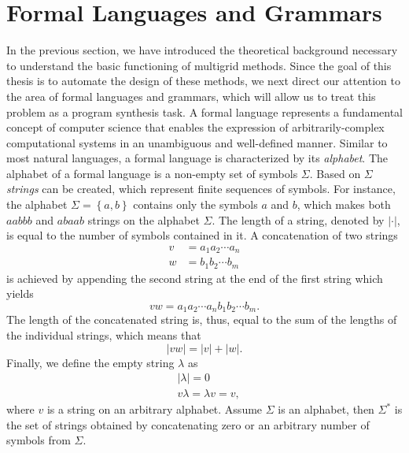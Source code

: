 \section{Formal Languages and Grammars}
\label{sec:formal-languages}
In the previous section, we have introduced the theoretical background necessary to understand the basic functioning of multigrid methods.
Since the goal of this thesis is to automate the design of these methods, we next direct our attention to the area of formal languages and grammars, which will allow us to treat this problem as a program synthesis task.
A formal language represents a fundamental concept of computer science that enables the expression of arbitrarily-complex computational systems in an unambiguous and well-defined manner.
Similar to most natural languages, a formal language is characterized by its \emph{alphabet}. 
The alphabet of a formal language is a non-empty set of symbols $\Sigma$.
Based on $\Sigma$ \emph{strings} can be created, which represent finite sequences of symbols.
For instance, the alphabet $\Sigma = \left\{a, b\right\}$ contains only the symbols $a$ and $b$, which makes both $aabbb$ and $abaab$ strings on the alphabet $\Sigma$.
The length of a string, denoted by $|\cdot|$, is equal to the number of symbols contained in it. 
A concatenation of two strings 
\begin{equation}
	\begin{split}
		v & = a_1 a_2 \cdots a_n \\
		w & = b_1 b_2 \cdots b_m
	\end{split}
\end{equation}
is achieved by appending the second string at the end of the first string which yields
\begin{equation}
	vw = a_1 a_2 \cdots a_n b_1 b_2 \cdots b_m.
\end{equation}
The length of the concatenated string is, thus, equal to the sum of the lengths of the individual strings, which means that
\begin{equation}
|vw| = |v| + |w|.
\end{equation}
Finally, we define the empty string $\lambda$ as
\begin{equation}
	\begin{split}
		& |\lambda| = 0 \\
		& v \lambda = \lambda v = v,
	\end{split}
\end{equation}
where $v$ is a string on an arbitrary alphabet.
Assume $\Sigma$ is an alphabet, then $\Sigma^*$ is the set of strings obtained by concatenating zero or an arbitrary number of symbols from $\Sigma$.

